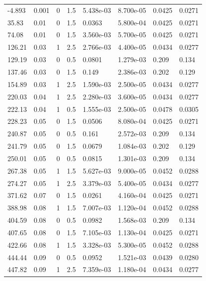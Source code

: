 \documentclass[preview]{standalone}
\begin{document}
{{\begin{tabular}{L{1.2cm}C{1.2cm} C{0.3cm}C{0.5cm} C{1.4cm}C{1.4cm} C{1.4cm}C{1.4cm}}
  -4.893  &  0.001  & 0     & 1.5 &  5.438e-03  & 8.700e-05  & 0.0425 &  0.0271   \\ 
  35.83  &  0.01  & 0     & 1.5 &  0.0363  & 5.800e-04  & 0.0425 &  0.0271   \\ 
  74.08  &  0.01  & 0     & 1.5 &  3.560e-03  & 5.700e-05  & 0.0425 &  0.0271   \\ 
  126.21  &  0.03  & 1     & 2.5 &  2.766e-03  & 4.400e-05  & 0.0434 &  0.0277   \\ 
  129.19  &  0.03  & 0     & 0.5 &  0.0801  & 1.279e-03  & 0.209 &  0.134   \\ 
  137.46  &  0.03  & 0     & 1.5 &  0.149  & 2.386e-03  & 0.202 &  0.129   \\ 
  154.89  &  0.03  & 1     & 2.5 &  1.590e-03  & 2.500e-05  & 0.0434 &  0.0277   \\ 
  220.03  &  0.04  & 1     & 2.5 &  2.280e-03  & 3.600e-05  & 0.0434 &  0.0277   \\ 
  222.13  &  0.04  & 1     & 0.5 &  1.555e-03  & 2.500e-05  & 0.0478 &  0.0305   \\ 
  228.23  &  0.05  & 0     & 1.5 &  0.0506  & 8.080e-04  & 0.0425 &  0.0271   \\ 
  240.87  &  0.05  & 0     & 0.5 &  0.161  & 2.572e-03  & 0.209 &  0.134   \\ 
  241.79  &  0.05  & 0     & 1.5 &  0.0679  & 1.084e-03  & 0.202 &  0.129   \\ 
  250.01  &  0.05  & 0     & 0.5 &  0.0815  & 1.301e-03  & 0.209 &  0.134   \\ 
  267.38  &  0.05  & 1     & 1.5 &  5.627e-03  & 9.000e-05  & 0.0452 &  0.0288   \\ 
  274.27  &  0.05  & 1     & 2.5 &  3.379e-03  & 5.400e-05  & 0.0434 &  0.0277   \\ 
  371.62  &  0.07  & 0     & 1.5 &  0.0261  & 4.160e-04  & 0.0425 &  0.0271   \\ 
  388.98  &  0.08  & 1     & 1.5 &  7.007e-03  & 1.120e-04  & 0.0452 &  0.0288   \\ 
  404.59  &  0.08  & 0     & 0.5 &  0.0982  & 1.568e-03  & 0.209 &  0.134   \\ 
  407.65  &  0.08  & 0     & 1.5 &  7.105e-03  & 1.130e-04  & 0.0425 &  0.0271   \\ 
  422.66  &  0.08  & 1     & 1.5 &  3.328e-03  & 5.300e-05  & 0.0452 &  0.0288   \\ 
  444.44  &  0.09  & 0     & 0.5 &  0.0952  & 1.521e-03  & 0.0439 &  0.0280   \\ 
  447.82  &  0.09  & 1     & 2.5 &  7.359e-03  & 1.180e-04  & 0.0434 &  0.0277   \\ 

\end{tabular}}}
\end{document}
